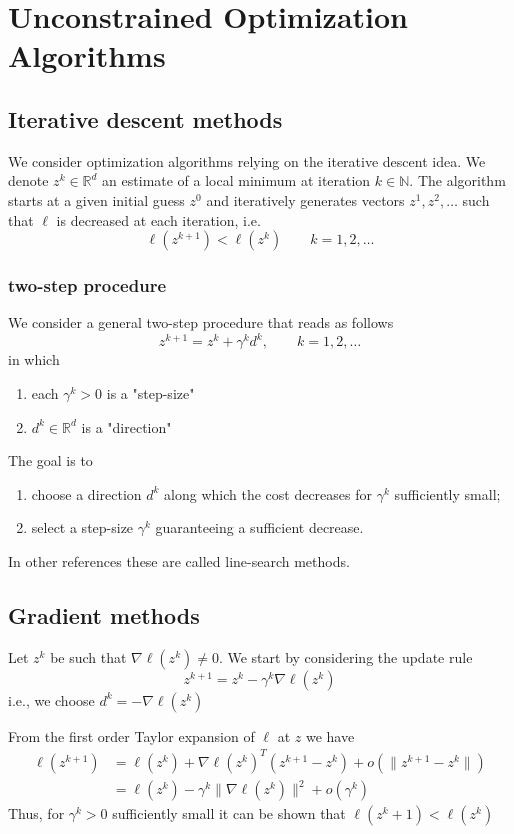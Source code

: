 \documentclass[openany]{book}
\newcommand{\R}{\mathbb{R}} %
\newcommand{\N}{\mathbb{N}} %
\theoremstyle{definition}
\theoremstyle{remark}
\begin{document}
\section{Unconstrained Optimization Algorithms}
\subsection{Iterative descent methods}
We consider optimization algorithms relying on the iterative descent idea. We denote $z^k\in\R^d$ an estimate of a local minimum at iteration $k\in\N$. The algorithm starts at a given initial guess $z^0$ and iteratively generates vectors $z^1,z^2,\dots$ such that $\ell$ is decreased at each iteration, i.e. 
\[
    \ell(z^{k+1})<\ell(z^k) \qquad k = 1,2,\dots
\]
\subsubsection{two-step procedure}
We consider a general two-step procedure that reads as follows 
\[
    z^{k+1} = z^k+\gamma^k d^k, \qquad k=1,2,\dots
\]
in which 
\begin{enumerate}
    \item each $\gamma^k>0$ is a "step-size" 
    \item $d^k\in\R^d$ is a "direction"
\end{enumerate}
The goal is to 
\begin{enumerate}
    \item choose a direction $d^k$ along which the cost decreases for $\gamma^k$ sufficiently small;
    \item select a step-size $\gamma^k$ guaranteeing a sufficient decrease. 
\end{enumerate}
In other references these are called line-search methods.
\subsection{Gradient methods}
Let $z^k$ be such that $\nabla\ell(z^k)\neq 0$. We start by considering the update rule 
\[
    z^{k+1} = z^k-\gamma^k\nabla\ell(z^k)
\]
i.e., we choose $d^k = -\nabla\ell(z^k)$

From the first order Taylor expansion of $\ell$ at $z$ we have 
\begin{align*}
    \ell(z^{k+1}) & =  \ell(z^k)+\nabla\ell(z^k)^T(z^{k+1}-z^k)+o(\|z^{k+1}-z^k\|)\\
    & =  \ell(z^k)-\gamma^k\|\nabla\ell(z^k)\|^2+o(\gamma^k)
\end{align*}
Thus, for $\gamma^k>0$ sufficiently small it can be shown that $\ell(z^k+1)<\ell(z^k)$
\end{document}
